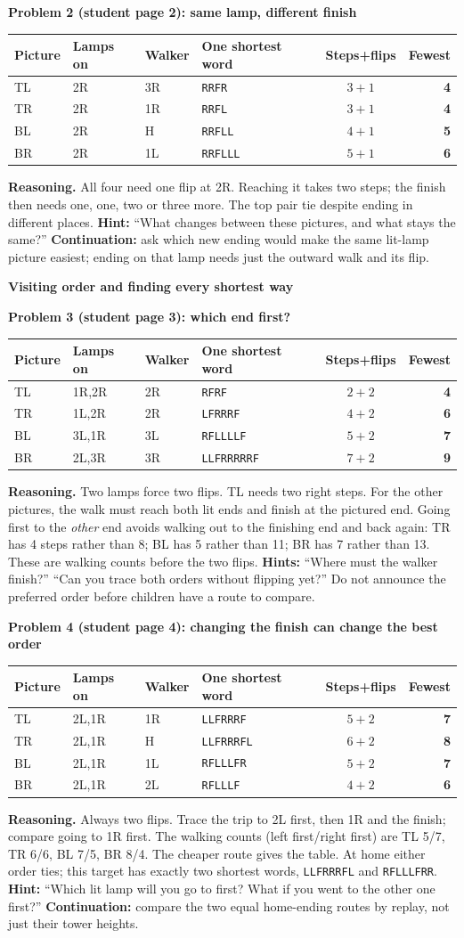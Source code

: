 \documentclass[11pt]{article}
\makeatletter
\newcommand{\head}[1]{\par\textbf{\large #1}\par}
\newcommand{\sub}[1]{\par\textbf{#1}\par}
\newcommand{\keyrow}[8]{#2 & #3 & #4 & \texttt{#5} & $#6+#7$ & \textbf{#8}\\}
\newenvironment{keytable}{\par\smallskip\begingroup\small\setlength{\tabcolsep}{7pt}\renewcommand{\arraystretch}{1.15}\begin{tabular}{@{}llllcr@{}}\textbf{Picture}&\textbf{Lamps on}&\textbf{Walker}&\textbf{One shortest word}&\textbf{Steps+flips}&\textbf{Fewest}\\\midrule}{\end{tabular}\endgroup\par\smallskip}
\makeatother
\begin{document}
\sub{Problem 2 (student page 2): same lamp, different finish}
\begin{keytable}
\keyrow{2TL}{TL}{2R}{3R}{RRFR}{3}{1}{4}
\keyrow{2TR}{TR}{2R}{1R}{RRFL}{3}{1}{4}
\keyrow{2BL}{BL}{2R}{H}{RRFLL}{4}{1}{5}
\keyrow{2BR}{BR}{2R}{1L}{RRFLLL}{5}{1}{6}
\end{keytable}
\textbf{Reasoning.} All four need one flip at 2R. Reaching it takes two steps; the finish then needs one, one, two or three more. The top pair tie despite ending in different places.
\textbf{Hint:} ``What changes between these pictures, and what stays the same?'' \textbf{Continuation:} ask which new ending would make the same lit-lamp picture easiest; ending on that lamp needs just the outward walk and its flip.
\newpage
\head{Visiting order and finding every shortest way}
\sub{Problem 3 (student page 3): which end first?}
\begin{keytable}
\keyrow{3TL}{TL}{1R,2R}{2R}{RFRF}{2}{2}{4}
\keyrow{3TR}{TR}{1L,2R}{2R}{LFRRRF}{4}{2}{6}
\keyrow{3BL}{BL}{3L,1R}{3L}{RFLLLLF}{5}{2}{7}
\keyrow{3BR}{BR}{2L,3R}{3R}{LLFRRRRRF}{7}{2}{9}
\end{keytable}
\textbf{Reasoning.} Two lamps force two flips. TL needs two right steps. For the other pictures, the walk must reach both lit ends and finish at the pictured end. Going first to the \emph{other} end avoids walking out to the finishing end and back again: TR has 4 steps rather than 8; BL has 5 rather than 11; BR has 7 rather than 13. These are walking counts before the two flips.
\textbf{Hints:} ``Where must the walker finish?'' ``Can you trace both orders without flipping yet?'' Do not announce the preferred order before children have a route to compare.

\sub{Problem 4 (student page 4): changing the finish can change the best order}
\begin{keytable}
\keyrow{4TL}{TL}{2L,1R}{1R}{LLFRRRF}{5}{2}{7}
\keyrow{4TR}{TR}{2L,1R}{H}{LLFRRRFL}{6}{2}{8}
\keyrow{4BL}{BL}{2L,1R}{1L}{RFLLLFR}{5}{2}{7}
\keyrow{4BR}{BR}{2L,1R}{2L}{RFLLLF}{4}{2}{6}
\end{keytable}
\textbf{Reasoning.} Always two flips. Trace the trip to 2L first, then 1R and the finish; compare going to 1R first. The walking counts (left first/right first) are TL 5/7, TR 6/6, BL 7/5, BR 8/4. The cheaper route gives the table. At home either order ties; this target has exactly two shortest words, \texttt{LLFRRRFL} and \texttt{RFLLLFRR}.
\textbf{Hint:} ``Which lit lamp will you go to first? What if you went to the other one first?'' \textbf{Continuation:} compare the two equal home-ending routes by replay, not just their tower heights.
\end{document}
